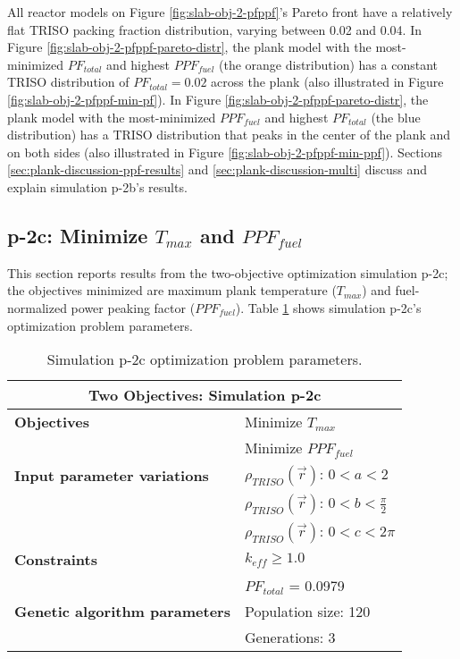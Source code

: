 All reactor models on Figure \ref{fig:slab-obj-2-pfppf}'s Pareto front have a relatively 
flat TRISO packing fraction distribution, varying between 0.02 and 0.04. 
In Figure \ref{fig:slab-obj-2-pfppf-pareto-distr}, the plank model with the 
most-minimized $PF_{total}$ and highest $PPF_{fuel}$
(the orange distribution) has a constant TRISO distribution of $PF_{total}=0.02$ 
across the plank (also illustrated in Figure \ref{fig:slab-obj-2-pfppf-min-pf}). 
In Figure \ref{fig:slab-obj-2-pfppf-pareto-distr}, the plank model with the 
most-minimized $PPF_{fuel}$ and highest $PF_{total}$
(the blue distribution) has a TRISO distribution that peaks in the center of the plank
and on both sides (also illustrated in Figure \ref{fig:slab-obj-2-pfppf-min-ppf}). 
Sections \ref{sec:plank-discussion-ppf-results} and \ref{sec:plank-discussion-multi}  
discuss and explain simulation p-2b's results.

\subsection{p-2c: Minimize $T_{max}$ and $PPF_{fuel}$}
\label{sec:p-2c}
This section reports results from the two-objective optimization simulation p-2c; the 
objectives minimized are maximum plank temperature ($T_{max}$) and fuel-normalized 
power peaking factor ($PPF_{fuel}$).  
Table \ref{tab:simulationp2c} shows simulation p-2c's optimization problem parameters. 
\begin{table}[htbp!]
    \centering
    \onehalfspacing
    \caption{Simulation p-2c optimization problem parameters.}
	\label{tab:simulationp2c}
    \footnotesize
    \begin{tabular}{l|p{4cm}}
    \hline 
    \multicolumn{2}{c}{\textbf{Two Objectives: Simulation p-2c}} \\
    \hline 
    \textbf{Objectives} & Minimize $T_{max}$ \\
    & Minimize $PPF_{fuel}$ \\
    \hline 
    \textbf{Input parameter variations} 
    & $\rho_{TRISO}(\vec{r})$: $0<a<2$ \\
    & $\rho_{TRISO}(\vec{r})$: $0<b<\frac{\pi}{2}$ \\
    & $\rho_{TRISO}(\vec{r})$: $0<c<2\pi$ \\
    \hline
    \textbf{Constraints} & $k_{eff} \geq 1.0$\\ 
    & $PF_{total}$ = 0.0979\\
    \hline 
    \textbf{Genetic algorithm parameters} & Population size: 120 \\
    & Generations: 3 \\
    \hline
    \end{tabular}
\end{table}

